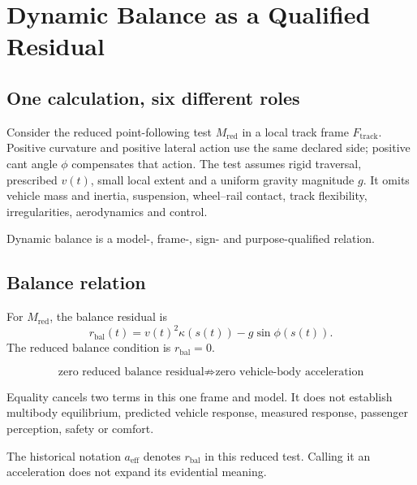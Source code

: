 \chapter{Dynamic Balance as a Qualified Residual}
\label{chap:dynamic-balance}

\section*{One calculation, six different roles}

Consider the reduced point-following test \(M_{\mathrm{red}}\) in a local
track frame \(F_{\mathrm{track}}\). Positive curvature and positive lateral
action use the same declared side; positive cant angle \(\phi\) compensates
that action. The test assumes rigid traversal, prescribed \(v(t)\), small
local extent and a uniform gravity magnitude \(g\). It omits vehicle mass and
inertia, suspension, wheel--rail contact, track flexibility, irregularities,
aerodynamics and control.

\begin{principle}
\label{princ:dynamic-balance}
Dynamic balance is a model-, frame-, sign- and purpose-qualified relation.
\end{principle}

\section{Balance relation}

\begin{definition}
\label{def:balance-relation}
For \(M_{\mathrm{red}}\), the balance residual is
\[
r_{\mathrm{bal}}(t)
=v(t)^2\kappa(s(t))-g\sin\phi(s(t)).
\]
The reduced balance condition is \(r_{\mathrm{bal}}=0\).
\end{definition}

\[
\boxed{\text{zero reduced balance residual}
\not\Rightarrow \text{zero vehicle-body acceleration}}
\]

Equality cancels two terms in this one frame and model. It does not establish
multibody equilibrium, predicted vehicle response, measured response,
passenger perception, safety or comfort.

\begin{definition}
\label{def:dynamics-effective-lateral-acceleration}
The historical notation \(a_{\mathrm{eff}}\) denotes
\(r_{\mathrm{bal}}\) in this reduced test. Calling it an acceleration does
not expand its evidential meaning.
\end{definition}

